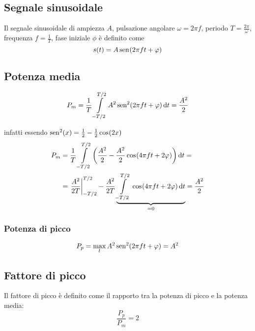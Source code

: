 \begin{enumerate}
\end{enumerate}

\subsection{Segnale sinusoidale}
Il segnale sinusoidale di ampiezza $A$, pulsazione angolare $\omega=2\pi f$, periodo $T=\frac{2\pi}{\omega}$, frequenza $f=\frac{1}{T}$, fase iniziale $\phi$ è definito come
\begin{equation}
	s(t)=A\,{\operatorname{sen}}^{}\!\left({2\pi f t+\varphi}\right)
\end{equation}

\subsection{Potenza media}
\begin{equation}
	P_m=\frac{1}{T}\int\limits_{-T/2}^{T/2}{A^2\operatorname{sen}^2(2\pi f t+\varphi)}{\,\mathop{}\!\mathrm{d}{t}}= \frac{A^2}{2}
\end{equation}

infatti essendo $\operatorname{sen}^2(x)=\frac{1}{2}-\frac{1}{2}\,{\operatorname{cos}}^{}\!\left({2x}\right)$
\[
	\begin{split}
	P_m&=\frac{1}{T}\int\limits_{-T/2}^{T/2}{\left(\frac{A^2}{2}-\frac{A^2}{2}\,{\operatorname{cos}}^{}\!\left({4\pi f t+2\varphi}\right)\right)}{\,\mathop{}\!\mathrm{d}{t}}=\\
	&=\left.{\frac{A^2}{2 T}}\right\rvert_{-T/2}^{T/2}-\frac{A^2}{2 T}\underbrace{\int\limits_{-T/2}^{T/2}{\,{\operatorname{cos}}^{}\!\left({4\pi f t+2\varphi}\right)}{\,\mathop{}\!\mathrm{d}{t}}}_{=0}=\frac{A^2}{2}
	\end{split}
\]

\subsubsection{Potenza di picco}
\begin{equation}
	P_p=\max\limits_{t} A^2\operatorname{sen}^2(2\pi f t+\varphi)=A^2
\end{equation}

\subsection{Fattore di picco}
Il fattore di picco è definito come il rapporto tra la potenza di picco e la potenza media:
\begin{equation}
	\frac{P_p}{P_m}=2
\end{equation}


